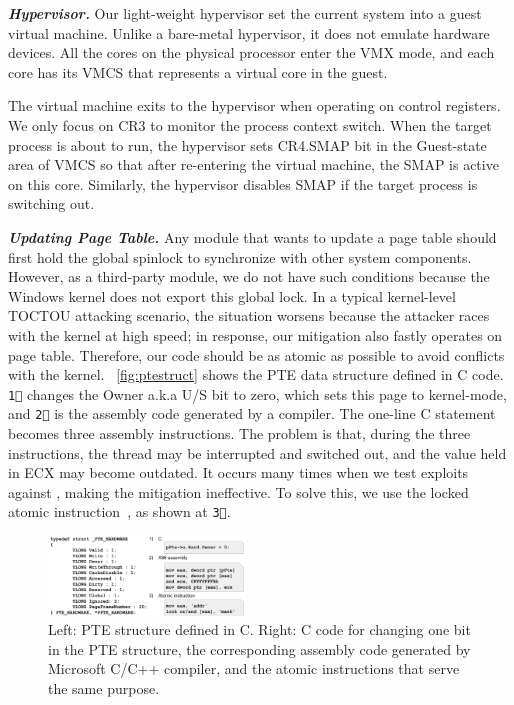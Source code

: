\textbf{\textit{Hypervisor.}} Our light-weight hypervisor set the current system into a guest virtual machine. Unlike a bare-metal hypervisor, it does not emulate hardware devices. All the cores on the physical processor enter the VMX mode, and each core has its VMCS that represents a virtual core in the guest.


The virtual machine exits to the hypervisor when operating on control registers. We only focus on CR3 to monitor the process context switch. When the target process is about to run, the hypervisor sets CR4.SMAP bit in the Guest-state area of VMCS so that after re-entering the virtual machine, the SMAP is active on this core. Similarly, the hypervisor disables SMAP if the target process is switching out.




\textbf{\textit{Updating Page Table.}} Any module that wants to update a page table should first hold the global spinlock to synchronize with other system components. However, as a third-party module, we do not have such conditions because the Windows kernel does not export this global lock. In a typical kernel-level TOCTOU attacking scenario, the situation worsens because the attacker races with the kernel at high speed; in response, our mitigation also fastly operates on page table. Therefore, our code should be as atomic as possible to avoid conflicts with the kernel. ~\autoref{fig:ptestruct} shows the PTE data structure defined in C code. \texttt{\textcircled{1}} changes the Owner a.k.a U/S bit to zero, which sets this page to kernel-mode, and \texttt{\textcircled{2}} is the assembly code generated by a compiler. The one-line C statement becomes three assembly instructions. The problem is that, during the three instructions, the thread may be interrupted and switched out, and the value held in ECX may become outdated. It occurs many times when we test exploits against \name, making the mitigation ineffective. To solve this, we use the locked atomic instruction~\cite{intelmanualchapter8}, as shown at \texttt{\textcircled{3}}.

\begin{figure}[th]
  \includegraphics[width=0.47\textwidth]{figures/ptestructcode}
  \centering
  \caption{Left: PTE structure defined in C. Right: C code for changing one bit in the PTE structure, the corresponding assembly code generated by Microsoft C/C++ compiler, and the atomic instructions that serve the same purpose.}
  \label{fig:ptestruct}
\end{figure}


